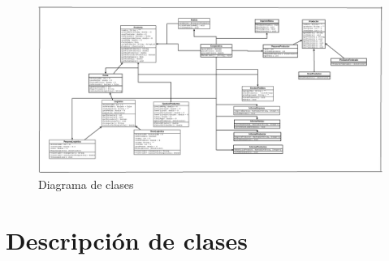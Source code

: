 \documentclass[10pt,a4paper]{article}
\begin{document}
\begin{figure}[H]
    \centering
    \includegraphics[width=\textwidth]{Diagrama_CoopEnBluej.png}
    \caption{Diagrama de clases}
    \label{fig:opcion1MP}
\end{figure}
  


\section{Descripción de clases}
\end{document}
